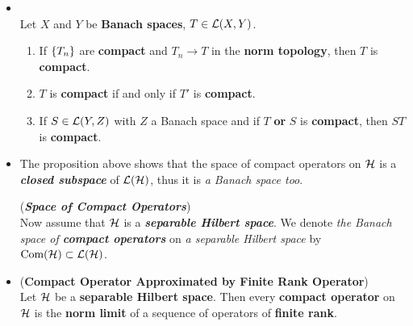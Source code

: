 \documentclass[11pt]{article}
\begin{document}
\begin{itemize}
\item \begin{proposition} \citep{reed1980methods}\\
Let $X$ and $Y$ be \textbf{Banach spaces}, $T \in {\mathcal L}(X, Y)$.
\begin{enumerate}
\item If  $\left\{T_n\right\}$ are \textbf{compact} and $T_n \rightarrow T$ in the \textbf{norm topology}, then $T$ is  \textbf{compact}. 
\item $T$ is \textbf{compact} if and only if $T'$ is \textbf{compact}. 
\item If $S \in {\mathcal L}(Y,  Z)$ with $Z$ a Banach space and if $T$ \textbf{or} $S$ is \textbf{compact}, then $ST$ is \textbf{compact}. 
\end{enumerate} 
\end{proposition}

\item The proposition above shows that the space of compact operators on ${\mathcal H}$ is a \emph{\textbf{closed subspace}} of ${\mathcal L}({\mathcal H})$, thus it is \emph{a Banach space too}.
\begin{definition} (\textbf{\emph{Space of Compact Operators}})\\
Now assume that ${\mathcal H}$ is a \emph{\textbf{separable Hilbert space}}. We denote \emph{the Banach space of \textbf{compact operators}} on \emph{a separable Hilbert space} by $\text{Com}({\mathcal H}) \subset {\mathcal L}({\mathcal H})$. 
\end{definition}

\item 
\begin{theorem} (\textbf{Compact Operator Approximated by Finite Rank Operator})\citep{reed1980methods}\\
Let ${\mathcal H}$ be a \textbf{separable Hilbert space}. Then every \textbf{compact operator} on ${\mathcal H}$ is the \textbf{norm limit} of a sequence of operators of \textbf{finite rank}. 
\end{theorem}

\end{itemize}
\end{document}
